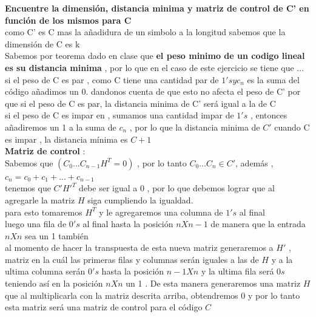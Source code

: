 \documentclass[10pt,a4paper]{article} %
\begin{document}
            \textbf{Encuentre la dimensión, distancia minima y matriz de
            control de C' en función de los mismos para C}
            \\
            como C' es C mas la añadidura de un simbolo a la longitud sabemos
            que la dimensión de C es k
            \\
            Sabemos por teorema dado en clase que \textbf{el peso minimo de un
            codigo lineal es su distancia minima} , por lo que en el caso de
            este ejercicio se tiene que  ...
            \\
            si el peso de C es par , como C tiene una cantidad par de $1's y
            c_n$ es la suma del código añadimos un 0. dandonos cuenta de que
            esto no afecta el peso de C' por que si el peso de C es par, la
            distancia minima de C' será igual a la de C
            \\
            si el peso de C es impar en , sumamos una cantidad impar de $1's$ ,
            entonces añadiremos un 1 a la suma de $c_n$ , por lo que la
            distancia minima de $C'$ cuando C es impar , la distancia mínima es
            $C+1$
            \\
            \textbf{Matriz de control} :
            \\
            Sabemos que $(C_0 ... C_{n-1} H ^{T}  = 0 )$ , por lo tanto $C_0
            ... C_n \in C'$, además , $c_n = c_0 + c_1 + ... + c_{n-1} $
            \\
            tenemos que $C'  H' ^{T} $ debe ser igual a 0 , por lo que
            debemos lograr que al agregarle la matriz $H$ siga cumpliendo la
            igualdad.
            \\
            para esto tomaremos $H ^{T} $ y le agregaremos una columna de $1's$
            al final
            \\
            luego una fila de $0's$ al final hasta la posición $nXn-1$
            de manera que la entrada  $nXn$ sea un 1 también
            \\
            al momento de
            hacer la transpuesta de esta nueva matriz generaremos a $H'$ ,
            matriz en la
            cuál las primeras filas y columnas serán iguales a las de $H$ y a
            la ultima columna serán $0's$ hasta la posición $n-1Xn$ y la ultima
            fila será $0s$ teniendo así en la posición $nXn$ un 1 .
            De esta manera generaremos una matriz $H$ que al multiplicarla con
            la matriz descrita arriba, obtendremos $0$ y por lo tanto esta
            matriz será una matriz de control para el código $C$
\end{document}
